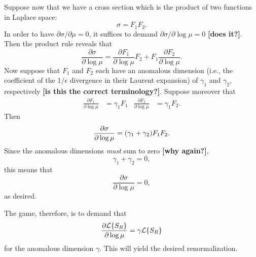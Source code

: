 \documentclass[11pt,twoside,reqno]{amsart}
\theoremstyle{plain}
\theoremstyle{remark}
\theoremstyle{definition}
\theoremstyle{remark}
\theoremstyle{definition}
\theoremstyle{definition}
\newcommand{\cL}{\mathcal{L}}
\begin{document}
	Suppose now that we have a cross section which is the product of two functions in Laplace space:
	\begin{equation}
		\sigma = F_1 F_2.
	\end{equation}
	In order to have $\partial \sigma/\partial\mu = 0$, it suffices to demand $\partial \sigma/\partial \log \mu = 0$ {\color{red}\textbf{[does it?]}}. Then the product rule reveals that
	\begin{equation}
		\frac{\partial \sigma}{\partial \log \mu} = \frac{\partial F_1}{\partial \log \mu}F_2 + F_1 \frac{\partial F_2}{\partial \log \mu}.
	\end{equation}
	Now suppose that $F_1$ and $F_2$ each have an anomalous dimension (i.e., the coefficient of the $1/\epsilon$ divergence in their Laurent expansion) of $\gamma_1$ and $\gamma_2$, respectively {\color{red}\textbf{[is this the correct terminology?]}}. Suppose moreover that \cite{frye_factorization_2016}
	\begin{align}
		\frac{\partial F_1}{\partial \log \mu} &= \gamma_1 F_1 & \frac{\partial F_2}{\partial \log \mu} &= \gamma_1 F_2.
	\end{align}
	Then
	\begin{equation}
		\frac{\partial \sigma}{\partial \log \mu} = \qty(\gamma_1 + \gamma_2) F_1 F_2.
	\end{equation}
	Since the anomalous dimensions \textit{must} sum to zero {\color{red}\textbf{[why again?]}},
	\begin{equation}
		\gamma_1 + \gamma_2 = 0,
	\end{equation}
	this means that
	\begin{equation}
		\frac{\partial \sigma}{\partial \log \mu} = 0,
	\end{equation}
	as desired.

	The game, therefore, is to demand that
	\begin{equation}
		\frac{\partial \cL\qty{S_R}}{\partial \log\mu} = \gamma \cL\qty{S_R}
	\end{equation}
	for the anomalous dimension $\gamma$. This will yield the desired renormalization.
\end{document}
